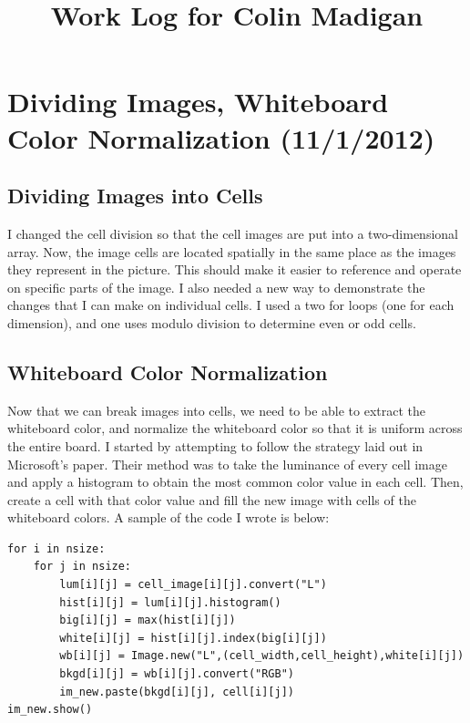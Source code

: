 \documentclass[]{article}
\begin{document}
\title{Work Log for Colin Madigan}
\date{}
\maketitle
	\tableofcontents

	\section{Dividing Images, Whiteboard Color Normalization (11/1/2012)}
	\subsection*{Dividing Images into Cells}
		I changed the cell division so that the cell images are put into a two-dimensional array.  Now, the image cells are located spatially in the same place as the images they represent in the picture.  This should make it easier to reference and operate on specific parts of the image.  I also needed a new way to demonstrate the changes that I can make on individual cells.  I used a two for loops (one for each dimension), and one uses modulo division to determine even or odd cells.
		
		\subsection*{Whiteboard Color Normalization}
		Now that we can break images into cells, we need to be able to extract the whiteboard color, and normalize the whiteboard color so that it is uniform across the entire board.  I started by attempting to follow the strategy laid out in Microsoft's paper.  Their method was to take the luminance of every cell image and apply a histogram to obtain the most common color value in each cell.  Then, create a cell with that color value and fill the new image with cells of the whiteboard colors.  A sample of the code I wrote is below:

\begin{verbatim}
for i in nsize:
    for j in nsize:
        lum[i][j] = cell_image[i][j].convert("L")
        hist[i][j] = lum[i][j].histogram()
        big[i][j] = max(hist[i][j])
        white[i][j] = hist[i][j].index(big[i][j])
        wb[i][j] = Image.new("L",(cell_width,cell_height),white[i][j])
        bkgd[i][j] = wb[i][j].convert("RGB")
        im_new.paste(bkgd[i][j], cell[i][j])
im_new.show()
\end{verbatim}
\end{document}

